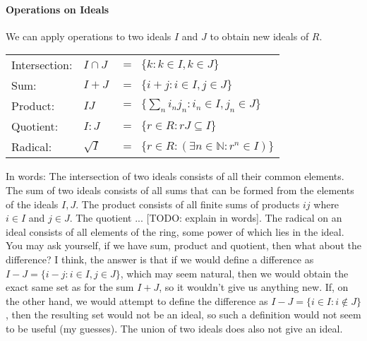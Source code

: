 
\paragraph{Operations on Ideals} We can apply operations to two ideals $I$ and $J$ to obtain new ideals of $R$.

\medskip
\begin{tabular}{l l l}
Intersection:  & $I \cap J$& $ = \;\; \{k : k \in I, k \in J\}$  \\
Sum:           & $I + J$   & $ = \;\; \{i + j : i \in I, j \in J\}$  \\
Product:       & $I J$     & $ = \;\; \{\sum_n i_n j_n : i_n \in I, j_n \in J\}$  \\
Quotient:      & $I:J$     & $ = \;\;  \{r \in R : r J \subseteq I\}$  \\
Radical:       & $\sqrt{I}$& $ = \;\; \{ r \in R : (\exists n \in \mathbb{N} :  r^n \in I) \}$  \\
\end{tabular}
\medskip

In words: The intersection of two ideals consists of all their common elements. The sum of two ideals consists of all sums that can be formed from the elements of the ideals $I,J$. The product consists of all finite sums of products $i j$ where $i \in I$ and $j \in J$. The quotient ... [TODO: explain in words]. The radical on an ideal consists of all elements of the ring, some power of which lies in the ideal. You may ask yourself, if we have sum, product and quotient, then what about the difference? I think, the answer is that if we would define a difference as $I - J = \{i - j : i \in I, j \in J\}$, which may seem natural, then we would obtain the exact same set as for the sum $I + J$, so it wouldn't give us anything new. If, on the other hand, we would attempt to define the difference as $I - J = \{i \in I : i \notin J\}$, then the resulting set would not be an ideal, so such a definition would not seem to be useful (my guesses). The union of two ideals does also not give an ideal.



